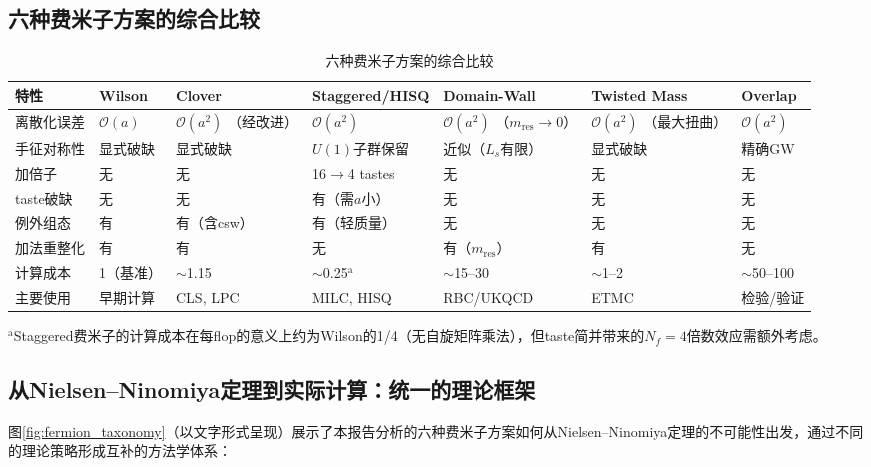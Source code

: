 \documentclass[12pt,a4paper]{ctexart}
\theoremstyle{definition}
\begin{document}
\subsection{六种费米子方案的综合比较}

\begin{table}[H]
\centering
\caption{六种费米子方案的综合比较}
\label{tab:full_comparison}
\small
\begin{tabular}{p{2cm}p{2.2cm}p{2.2cm}p{2.2cm}p{2.2cm}p{2.2cm}p{2.2cm}}
\toprule
特性 & Wilson & Clover & Staggered/HISQ & Domain-Wall & Twisted Mass & Overlap \\
\midrule
离散化误差 & $\mathcal{O}(a)$ & $\mathcal{O}(a^2)$ {\small（经改进）} & $\mathcal{O}(a^2)$ & $\mathcal{O}(a^2)$ {\small（$m_{\text{res}}\to 0$）} & $\mathcal{O}(a^2)$ {\small（最大扭曲）} & $\mathcal{O}(a^2)$ \\
手征对称性 & 显式破缺 & 显式破缺 & $U(1)$子群保留 & 近似（$L_s$有限） & 显式破缺 & 精确GW \\
加倍子 & 无 & 无 & 16$\to$4 tastes & 无 & 无 & 无 \\
taste破缺 & 无 & 无 & 有（需$a$小） & 无 & 无 & 无 \\
例外组态 & 有 & 有（含csw） & 有（轻质量） & 无 & 无 & 无 \\
加法重整化 & 有 & 有 & 无 & 有（$m_{\text{res}}$） & 有 & 无 \\
计算成本 & 1（基准） & $\sim$1.15 & $\sim$0.25$^{\text{a}}$ & $\sim$15--30 & $\sim$1--2 & $\sim$50--100 \\
主要使用 & 早期计算 & CLS, LPC & MILC, HISQ & RBC/UKQCD & ETMC & 检验/验证 \\
\bottomrule
\end{tabular}

\vspace{3pt}
\footnotesize
$^{\text{a}}$Staggered费米子的计算成本在每flop的意义上约为Wilson的1/4（无自旋矩阵乘法），但taste简并带来的$N_f=4$倍数效应需额外考虑。
\end{table}

\subsection{从Nielsen--Ninomiya定理到实际计算：统一的理论框架}

图\ref{fig:fermion_taxonomy}（以文字形式呈现）展示了本报告分析的六种费米子方案如何从Nielsen--Ninomiya定理的不可能性出发，通过不同的理论策略形成互补的方法学体系：
\end{document}
